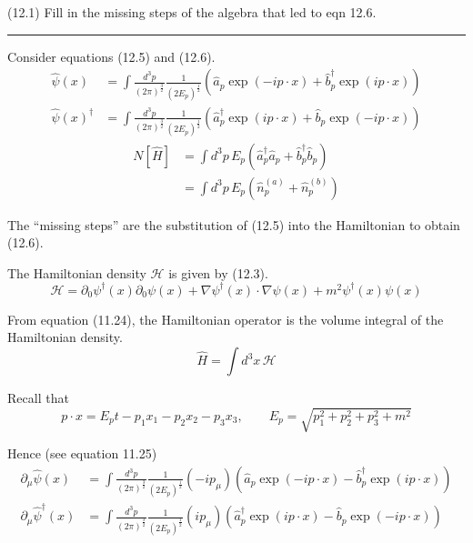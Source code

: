 \documentclass[12pt]{article}
\begin{document}
(12.1)
Fill in the missing steps of the algebra that led to
eqn 12.6.

\bigskip
\hrule

\bigskip
Consider equations (12.5) and (12.6).
\begin{equation*}
\begin{aligned}
\hat\psi(x)&=\int\frac{d^3p}{(2\pi)^\frac{3}{2}}\frac{1}{(2E_p)^\frac{1}{2}}
\left(\hat a_p\exp(-ip\cdot x)+\hat b_p^\dag\exp(ip\cdot x)\right)
\\
\hat\psi(x)^\dag&=\int\frac{d^3p}{(2\pi)^\frac{3}{2}}\frac{1}{(2E_p)^\frac{1}{2}}
\left(\hat a_p^\dag\exp(ip\cdot x)+\hat b_p\exp(-ip\cdot x)\right)
\end{aligned}
\tag{12.5}
\end{equation*}
\begin{equation*}
\begin{aligned}
N[\hat H]&=\int d^3p\,E_p\left(\hat a_p^\dag\hat a_p+\hat b_p^\dag\hat b_p\right)
\\
&=\int d^3p\,E_p\left(\hat n_p^{(a)}+\hat n_p^{(b)}\right)
\end{aligned}
\tag{12.6}
\end{equation*}

The ``missing steps'' are the substitution of (12.5) into the Hamiltonian to obtain (12.6).

\bigskip
The Hamiltonian density $\mathcal H$ is given by (12.3).
\begin{equation*}
\mathcal H=\partial_0\psi^\dag(x)\partial_0\psi(x)+\nabla\psi^\dag(x)\cdot\nabla\psi(x)+m^2\psi^\dag(x)\psi(x)
\tag{12.3}
\end{equation*}

From equation (11.24), the Hamiltonian operator is the volume integral of the Hamiltonian density.
\begin{equation*}
\hat H=\int d^3x\,\mathcal H
\end{equation*}

Recall that
\begin{equation*}
p\cdot x=E_pt-p_1x_1-p_2x_2-p_3x_3,\qquad E_p=\sqrt{p_1^2+p_2^2+p_3^2+m^2}
\end{equation*}

Hence (see equation 11.25)
\begin{equation*}
\begin{aligned}
\partial_\mu\hat\psi(x)
&=\int\frac{d^3p}{(2\pi)^\frac{3}{2}}\frac{1}{(2E_p)^\frac{1}{2}}(-ip_\mu)
\left(\hat a_p\exp(-ip\cdot x)-\hat b_p^\dag\exp(ip\cdot x)\right)
\\
\partial_\mu\hat\psi^\dag(x)
&=\int\frac{d^3p}{(2\pi)^\frac{3}{2}}\frac{1}{(2E_p)^\frac{1}{2}}(ip_\mu)
\left(\hat a_p^\dag\exp(ip\cdot x)-\hat b_p\exp(-ip\cdot x)\right)
\end{aligned}
\end{equation*}
\end{document}
